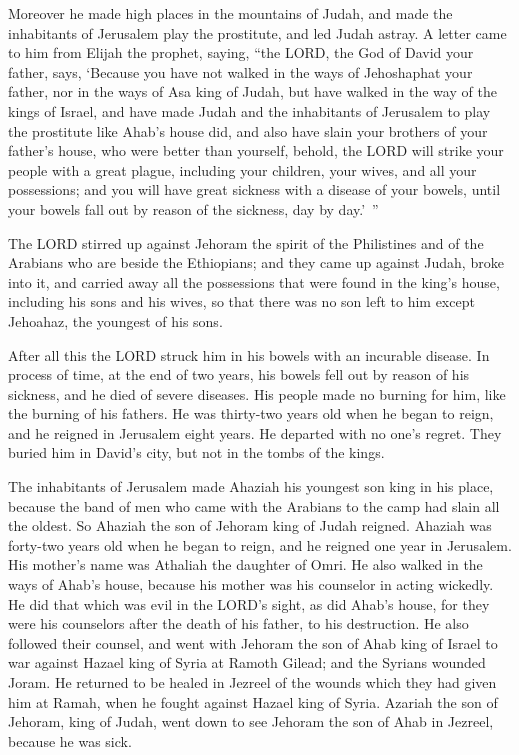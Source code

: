 \myverse{}Moreover he made high places in the mountains of Judah, and
made the inhabitants of Jerusalem play the prostitute, and led Judah astray.
\myverse{}A letter came to him from Elijah the prophet, saying, “the LORD, the God
of David your father, says, ‘Because you have not walked in the ways of Jehoshaphat your father, nor in
the ways of Asa king of Judah,
\myverse{}but have walked in the way of the kings of Israel, and have made Judah and
the inhabitants of Jerusalem to play the prostitute like Ahab’s house did, and also have slain your brothers
of your father’s house, who were better than yourself,
\myverse{}behold, the LORD will strike your people with a great plague, including your
children, your wives, and all your possessions;
\myverse{}and you will have great sickness with a disease of your bowels, until your
bowels fall out by reason of the sickness, day by day.’ ”

\myverse{}The LORD stirred up against Jehoram the spirit of the Philistines
and of the Arabians who are beside the Ethiopians;
\myverse{}and they came up against Judah, broke into it, and carried away all the possessions
that were found in the king’s house, including his sons and his wives, so that there was no son left to
him except Jehoahaz, the youngest of his sons.

\myverse{}After all this the LORD struck him in his bowels with an incurable
disease.
\myverse{}In process of time, at the end of two years, his bowels fell out by reason
of his sickness, and he died of severe diseases. His people made no burning for him, like the burning
of his fathers.
\myverse{}He was thirty-two years old when he began to reign, and he reigned in Jerusalem
eight years. He departed with no one’s regret. They buried him in David’s city, but not in the tombs of
the kings.


\mychapter{} \myverse*{}The inhabitants of Jerusalem made Ahaziah his youngest son king
in his place, because the band of men who came with the Arabians to the camp had slain all the oldest.
So Ahaziah the son of Jehoram king of Judah reigned.
\myverse{}Ahaziah was forty-two years old when he began to reign, and he reigned one
year in Jerusalem. His mother’s name was Athaliah the daughter of Omri.
\myverse{}He also walked in the ways of Ahab’s house, because his mother was his counselor
in acting wickedly.
\myverse{}He did that which was evil in the LORD’s sight, as did Ahab’s house, for they
were his counselors after the death of his father, to his destruction.
\myverse{}He also followed their counsel, and went with Jehoram the son of Ahab king
of Israel to war against Hazael king of Syria at Ramoth Gilead; and the Syrians wounded Joram.
\myverse{}He returned to be healed in Jezreel of the wounds which they had given him
at Ramah, when he fought against Hazael king of Syria. Azariah the son of Jehoram, king of Judah, went
down to see Jehoram the son of Ahab in Jezreel, because he was sick.


